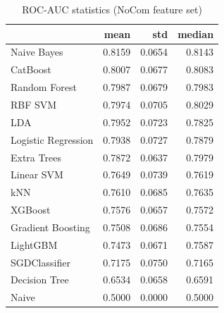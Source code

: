 \begin{table}
\caption{ROC-AUC statistics (NoCom feature set)}
\label{tab:roc-auc_NoCom_stats}
\begin{tabular}{lrrr}
\toprule
 & mean & std & median \\
\midrule
Naive Bayes & 0.8159 & 0.0654 & 0.8143 \\
CatBoost & 0.8007 & 0.0677 & 0.8083 \\
Random Forest & 0.7987 & 0.0679 & 0.7983 \\
RBF SVM & 0.7974 & 0.0705 & 0.8029 \\
LDA & 0.7952 & 0.0723 & 0.7825 \\
Logistic Regression & 0.7938 & 0.0727 & 0.7879 \\
Extra Trees & 0.7872 & 0.0637 & 0.7979 \\
Linear SVM & 0.7649 & 0.0739 & 0.7619 \\
kNN & 0.7610 & 0.0685 & 0.7635 \\
XGBoost & 0.7576 & 0.0657 & 0.7572 \\
Gradient Boosting & 0.7508 & 0.0686 & 0.7554 \\
LightGBM & 0.7473 & 0.0671 & 0.7587 \\
SGDClassifier & 0.7175 & 0.0750 & 0.7165 \\
Decision Tree & 0.6534 & 0.0658 & 0.6591 \\
Naive & 0.5000 & 0.0000 & 0.5000 \\
\bottomrule
\end{tabular}
\end{table}
